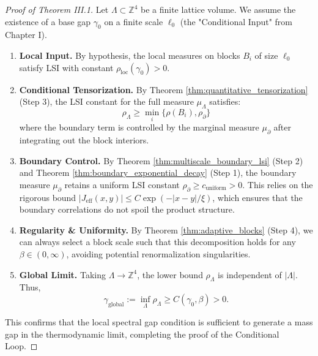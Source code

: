 \begin{proof}[Proof of Theorem III.1]
Let $\Lambda \subset \mathbb{Z}^4$ be a finite lattice volume. We assume the existence of a base gap $\gamma_0$ on a finite scale $\ell_0$ (the "Conditional Input" from Chapter I).

\begin{enumerate}
    \item \textbf{Local Input.} By hypothesis, the local measures on blocks $B_i$ of size $\ell_0$ satisfy LSI with constant $\rho_{\text{loc}}(\gamma_0) > 0$.
    
    \item \textbf{Conditional Tensorization.} By Theorem \ref{thm:quantitative_tensorization} (Step 3), the LSI constant for the full measure $\mu_\Lambda$ satisfies:
    \begin{equation}
    \rho_\Lambda \geq \min_i \{\rho(B_i), \rho_{\partial}\}
    \end{equation}
    where the boundary term is controlled by the marginal measure $\mu_{\partial}$ after integrating out the block interiors.
    
    \item \textbf{Boundary Control.} By Theorem \ref{thm:multiscale_boundary_lsi} (Step 2) and Theorem \ref{thm:boundary_exponential_decay} (Step 1), the boundary measure $\mu_{\partial}$ retains a uniform LSI constant $\rho_{\partial} \geq c_{\text{uniform}} > 0$. This relies on the rigorous bound $|J_{\text{eff}}(x,y)| \leq C \exp(-|x-y|/\xi)$, which ensures that the boundary correlations do not spoil the product structure.
    
    \item \textbf{Regularity \& Uniformity.} By Theorem \ref{thm:adaptive_blocks} (Step 4), we can always select a block scale such that this decomposition holds for any $\beta \in (0, \infty)$, avoiding potential renormalization singularities.
    
    \item \textbf{Global Limit.} Taking $\Lambda \to \mathbb{Z}^4$, the lower bound $\rho_\Lambda$ is independent of $|\Lambda|$. Thus,
    \begin{equation}
    \gamma_{\text{global}} := \inf_{\Lambda} \rho_\Lambda \geq C(\gamma_0, \beta) > 0.
    \end{equation}
\end{enumerate}
This confirms that the local spectral gap condition is sufficient to generate a mass gap in the thermodynamic limit, completing the proof of the Conditional Loop.
\end{proof}

